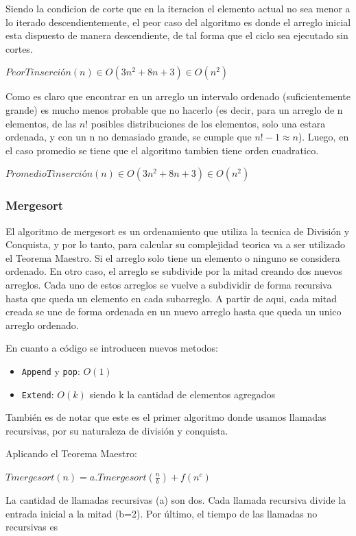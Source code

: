 \documentclass[article,a4paper]{article}
\begin{document}
Siendo la condicion de corte que en la iteracion el elemento actual no sea menor a lo iterado descendientemente, el peor caso del algoritmo es donde el arreglo inicial esta dispuesto de manera descendiente, de tal forma que el ciclo sea ejecutado sin cortes.

$PeorTinserción(n) \in O(3n^2 + 8n + 3) \in O(n^2)$

Como es claro que encontrar en un arreglo un intervalo ordenado (suficientemente grande) es mucho menos probable que no hacerlo (es decir, para un arreglo de n elementos, de las $n!$ posibles distribuciones de los elementos, solo una estara ordenada, y con un n no demasiado grande, se cumple que $n!-1 \approx n$). Luego, en el caso promedio se tiene que el algoritmo tambien tiene orden cuadratico.

$PromedioTinserción(n) \in O(3n^2 + 8n + 3) \in O(n^2)$

\subsubsection{Mergesort}

El algoritmo de mergesort es un ordenamiento que utiliza la tecnica de División y Conquista, y por lo tanto, para calcular su complejidad teorica va a ser utilizado el Teorema Maestro. Si el arreglo solo tiene un elemento o ninguno se considera ordenado. En otro caso, el arreglo se subdivide por la mitad creando dos nuevos arreglos. Cada uno de estos arreglos se vuelve a subdividir de forma recursiva hasta que queda un elemento en cada subarreglo. A partir de aqui, cada mitad creada se une de forma ordenada en un nuevo arreglo hasta que queda un unico arreglo ordenado.

En cuanto a código se introducen nuevos metodos:

\begin{itemize}
\item \texttt{Append} y \texttt{pop}: $O(1)$
\item \texttt{Extend}: $O(k)$ siendo k la cantidad de elementos agregados 
\end{itemize}

También es de notar que este es el primer algoritmo donde usamos llamadas recursivas, por su naturaleza de división y conquista.

Aplicando el Teorema Maestro: 

$Tmergesort(n) = a.Tmergesort(\frac{n}{b}) + f(n^c)$

La cantidad de llamadas recursivas (a) son dos. Cada llamada recursiva divide la entrada inicial a la mitad (b=2). Por último, el tiempo de las llamadas no recursivas es 
\end{document}
